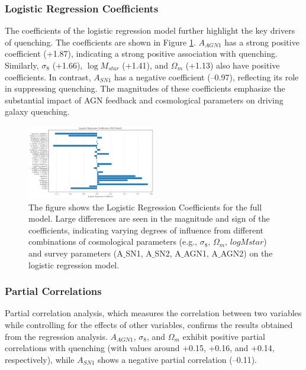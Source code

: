 \documentclass[twocolumn]{aastex631}
\begin{document}
\subsubsection{Logistic Regression Coefficients}

The coefficients of the logistic regression model further highlight the key drivers of quenching. The coefficients are shown in Figure \ref{fig:logreg_coefficients}. \(A_{AGN1}\) has a strong positive coefficient (+1.87), indicating a strong positive association with quenching. Similarly, \(\sigma_8\) (+1.66), \(\log M_{star}\) (+1.41), and \(\Omega_m\) (+1.13) also have positive coefficients. In contrast, \(A_{SN1}\) has a negative coefficient (–0.97), reflecting its role in suppressing quenching. The magnitudes of these coefficients emphasize the substantial impact of AGN feedback and cosmological parameters on driving galaxy quenching.

\begin{figure}[h!]
    \centering
    \includegraphics[width=0.5\textwidth]{../Project6/plots/logreg_coefficients_20250424_133935.png}
    \caption{\label{fig:logreg_coefficients} The figure shows the Logistic Regression Coefficients for the full model. Large differences are seen in the magnitude and sign of the coefficients, indicating varying degrees of influence from different combinations of cosmological parameters (e.g., $\sigma_8$, $\Omega_m$, $logMstar$) and survey parameters (A\ensuremath{\_}SN1, A\ensuremath{\_}SN2, A\ensuremath{\_}AGN1, A\ensuremath{\_}AGN2) on the logistic regression model.
}
\end{figure}

\subsubsection{Partial Correlations}

Partial correlation analysis, which measures the correlation between two variables while controlling for the effects of other variables, confirms the results obtained from the regression analysis. \(A_{AGN1}\), \(\sigma_8\), and \(\Omega_m\) exhibit positive partial correlations with quenching (with values around +0.15, +0.16, and +0.14, respectively), while \(A_{SN1}\) shows a negative partial correlation (–0.11).
\end{document}

